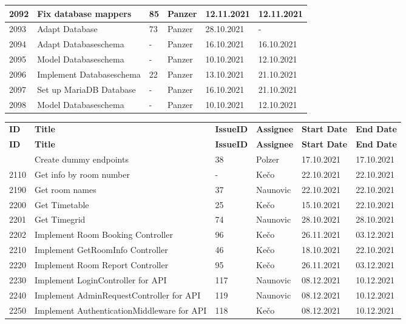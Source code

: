 \begin{longtable}{|p{}|p{}|p{}|p{}|p{}|p{}|}
    2092 & Fix database mappers & 85 & Panzer & 12.11.2021 & 12.11.2021 \\ \hline
    2093 & Adapt Database & 73 & Panzer & 28.10.2021 & - \\ \hline
    2094 & Adapt Databaseschema & - & Panzer & 16.10.2021 & 16.10.2021 \\ \hline
    2095 & Model Databaseschema & - & Panzer & 10.10.2021 & 12.10.2021 \\ \hline
    2096 & Implement Databaseschema & 22 & Panzer & 13.10.2021 & 21.10.2021 \\ \hline
    2097 & Set up MariaDB Database & - & Panzer & 16.10.2021 & 21.10.2021 \\ \hline
    2098 & Model Databaseschema & - & Panzer & 10.10.2021 & 12.10.2021 \\ \hline
\end{longtable}

\begin{longtable}{|p{}|p{}|p{}|p{}|p{}|p{}|} \hline
    \textbf{ID} & \textbf{Title} & \textbf{Issue\-ID} & \textbf{Assignee} & \textbf{Start Date} & \textbf{End\- Date} \\ \hhline{|=|=|=|=|=|=|}
    \endfirsthead
    \hline
    \textbf{ID} & \textbf{Title} & \textbf{Issue\-ID} & \textbf{Assignee} & \textbf{Start Date} & \textbf{End\- Date} \\ \hhline{|=|=|=|=|=|=|}
    \endhead
    2100 & Create dummy endpoints & 38 & Polzer & 17.10.2021 & 17.10.2021 \\ \hline
    2110 & Get info by room number & - & Kečo & 22.10.2021 & 22.10.2021 \\ \hline
    2190 & Get room names & 37 & Naunovic & 22.10.2021 & 22.10.2021 \\ \hline
    2200 & Get Timetable & 25 & Kečo & 15.10.2021 & 22.10.2021 \\ \hline
    2201 & Get Timegrid & 74 & Naunovic & 28.10.2021 & 28.10.2021 \\ \hline
    2202 & Implement Room Booking Controller & 96 & Kečo & 26.11.2021 & 03.12.2021 \\ \hline
    2210 & Implement GetRoomInfo Controller & 46 & Kečo & 18.10.2021 & 22.10.2021 \\ \hline
    2220 & Implement Room Report Controller & 95 & Kečo & 26.11.2021 & 03.12.2021 \\ \hline
    2230 & Implement LoginController for API & 117 & Naunovic & 08.12.2021 & 10.12.2021 \\ \hline
    2240 & Implement AdminRequestController for API & 119 & Naunovic & 08.12.2021 & 10.12.2021 \\ \hline
    2250 & Implement AuthenticationMiddleware for API & 118 & Kečo & 08.12.2021 & 10.12.2021 \\ \hline
\end{longtable}

